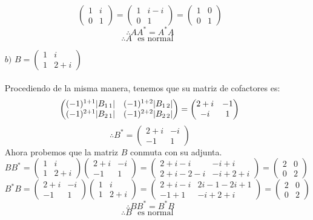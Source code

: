 \begin{itemize}
\[\begin{pmatrix}
	1 & i \\
	0 & 1 \end{pmatrix} = \begin{pmatrix}
	1 & i-i \\
	0 & 1 \end{pmatrix}=\begin{pmatrix}
	1 & 0 \\
	0 & 1 \end{pmatrix}\]
	\[\therefore AA^*=A^*A\]\[\therefore A ~~~\text{es normal}~~~\]
    \item [$b)$] $B=\begin{pmatrix}
	1 & i \\
	1 & 2+i \end{pmatrix}$\\\\Procediendo de la misma manera, tenemos que su matriz de cofactores es:\[\begin{pmatrix}
	(-1)^{1+1}|B_{1\hspace{0.5mm}1}| & (-1)^{1+2}|B_{1\hspace{0.5mm}2}| \\
	(-1)^{2+1}|B_{2\hspace{0.5mm}1}| & (-1)^{2+2}|B_{2\hspace{0.5mm}2}|\end{pmatrix}=\begin{pmatrix}
	2+i & -1 \\
	-i & 1 \end{pmatrix}\]\[\therefore B^*=\begin{pmatrix}
	2+i & -i \\
	-1 & 1 \end{pmatrix}\]
	Ahora probemos que la matriz $B$ conmuta con su adjunta.
	\[BB^*=\begin{pmatrix}
	1 & i \\
	1 & 2+i \end{pmatrix}\begin{pmatrix}
	2+i & -i \\
	-1 & 1 \end{pmatrix}=\begin{pmatrix}
	2+i-i & -i+i \\
	2+i-2-i & -i+2+i \end{pmatrix}=\begin{pmatrix}
	2 & 0 \\
	0 & 2 \end{pmatrix} \]
	\[B^*B=\begin{pmatrix}
	2+i & -i \\
	-1 & 1 \end{pmatrix}\begin{pmatrix}
	1 & i \\
	1 & 2+i \end{pmatrix}=\begin{pmatrix}
	2+i-i & 2i-1-2i+1 \\
	-1+1 & -i+2+i \end{pmatrix}=\begin{pmatrix}
	2 & 0 \\
	0 & 2 \end{pmatrix} \]
	\[\therefore BB^*=B^*B\]\[\therefore B ~~~\text{es normal}~~~\]
	
\end{itemize}
